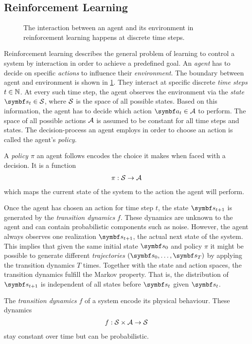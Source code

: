 \subsection{Reinforcement Learning}
\label{sub:reinforcement_learning}
\begin{figure}[t]
    \centering
    
    \caption[Agent-environment interaction]{
        The interaction between an agent and its environment in reinforcement learning happens at discrete time steps.
    }
    \label{fig:agent_environment_interaction}
\end{figure}
Reinforcement learning describes the general problem of learning to control a system by interaction in order to achieve a predefined goal.
An \emph{agent} has to decide on specific \emph{actions} to influence their \emph{environment}.
The boundary between agent and environment is shown in \cref{fig:agent_environment_interaction}.
They interact at specific discrete \emph{time steps} $t \in \mathbb{N}$.
At every such time step, the agent observes the environment via the \emph{state} $\mat{s}_t \in \Sc$, where $\mathcal{S}$ is the space of all possible states.
Based on this information, the agent has to decide which action $\mat{a}_t \in \Ac$ to perform.
The space of all possible actions $\mathcal{A}$ is assumed to be constant for all time steps and states.
The decision-process an agent employs in order to choose an action is called the agent's \emph{policy}.

\begin{definition}[Policy]
    A \emph{policy $\pi$} an agent follows encodes the choice it makes when faced with a decision.
    It is a function
    \begin{align}
        \pi: \mathcal{S} \to \mathcal{A}
    \end{align}
    which maps the current state of the system to the action the agent will perform.
\end{definition}

Once the agent has chosen an action for time step $t$, the state $\mat{s}_{t+1}$ is generated by the \emph{transition dynamics} $f$.
These dynamics are unknown to the agent and can contain probabilistic components such as noise.
However, the agent always observes one realization $\mat{s}_{t+1}$, the actual next state of the system.
This implies that given the same initial state $\mat{s}_0$ and policy $\pi$ it might be possible to generate different \emph{trajectories} $(\mat{s}_0, \dots, \mat{s}_T)$ by applying the transition dynamics $T$ times.
Together with the state and action spaces, the transition dynamics fulfill the Markov property.
That is, the distribution of $\mat{s}_{t+1}$ is independent of all states before $\mat{s}_t$ given $\mat{s}_t$.
\begin{definition}
    \label{def:transition_dynamics}
    The \emph{transition dynamics $f$} of a system encode its physical behaviour.
    These dynamics
    \begin{align}
        f: \mathcal{S} \times \mathcal{A} \to \mathcal{S}
    \end{align}
    stay constant over time but can be probabilistic.
\end{definition}

